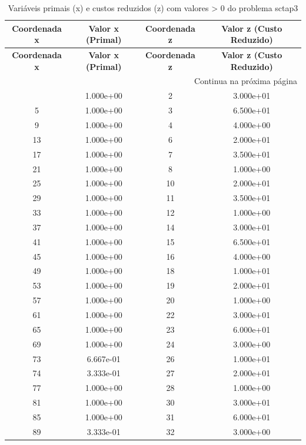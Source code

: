 \documentclass[12pt]{article}
\begin{document}
\begin{longtable}{@{}cccc@{}}
\caption{Variáveis primais (x) e custos reduzidos (z) com valores > 0 do problema sctap3} \\
\toprule
\textbf{Coordenada x} & \textbf{Valor x (Primal)} & \textbf{Coordenada z} & \textbf{Valor z (Custo Reduzido)} \\
\midrule
\endfirsthead

\toprule
\textbf{Coordenada x} & \textbf{Valor x (Primal)} & \textbf{Coordenada z} & \textbf{Valor z (Custo Reduzido)} \\
\midrule
\endhead

\midrule \multicolumn{4}{r}{{Continua na próxima página}} \\ \midrule
\endfoot

\bottomrule
\endlastfoot
1 & 1.000e+00 & 2 & 3.000e+01 \\
5 & 1.000e+00 & 3 & 6.500e+01 \\
9 & 1.000e+00 & 4 & 4.000e+00 \\
13 & 1.000e+00 & 6 & 2.000e+01 \\
17 & 1.000e+00 & 7 & 3.500e+01 \\
21 & 1.000e+00 & 8 & 1.000e+00 \\
25 & 1.000e+00 & 10 & 2.000e+01 \\
29 & 1.000e+00 & 11 & 3.500e+01 \\
33 & 1.000e+00 & 12 & 1.000e+00 \\
37 & 1.000e+00 & 14 & 3.000e+01 \\
41 & 1.000e+00 & 15 & 6.500e+01 \\
45 & 1.000e+00 & 16 & 4.000e+00 \\
49 & 1.000e+00 & 18 & 1.000e+01 \\
53 & 1.000e+00 & 19 & 2.000e+01 \\
57 & 1.000e+00 & 20 & 1.000e+00 \\
61 & 1.000e+00 & 22 & 3.000e+01 \\
65 & 1.000e+00 & 23 & 6.000e+01 \\
69 & 1.000e+00 & 24 & 3.000e+00 \\
73 & 6.667e-01 & 26 & 1.000e+01 \\
74 & 3.333e-01 & 27 & 2.000e+01 \\
77 & 1.000e+00 & 28 & 1.000e+00 \\
81 & 1.000e+00 & 30 & 3.000e+01 \\
85 & 1.000e+00 & 31 & 6.000e+01 \\
89 & 3.333e-01 & 32 & 3.000e+00 \\

\end{longtable}
\end{document}

